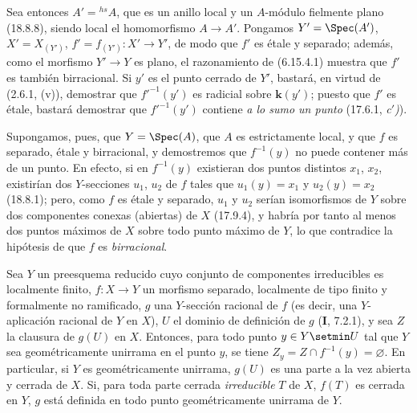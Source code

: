 
Sea entonces $A'={}^{hs}\!A$, que es un anillo local y un $A$-módulo fielmente plano (18.8.8), siendo local el homomorfismo $A\to A'$. Pongamos $Y'=\Spec(A')$, $X'=X_{(Y')}$, $f'=f_{(Y')}:X'\to Y'$, de modo que $f'$ es étale y separado; además, como el morfismo $Y'\to Y$ es plano, el razonamiento de (6.15.4.1) muestra que $f'$ es también birracional. Si $y'$ es el punto cerrado de $Y'$, bastará, en virtud de (2.6.1, (v)), demostrar que $f'^{-1}(y')$ es radicial sobre $\boldsymbol k(y')$; puesto que $f'$ es étale, bastará demostrar que $f'^{-1}(y')$ contiene \emph{a lo sumo un punto} (17.6.1, \emph{c$'$)}).

Supongamos, pues, que $Y=\Spec(A)$, que $A$ es estrictamente local, y que $f$ es separado, étale y birracional, y demostremos que $f^{-1}(y)$ no puede contener más de un punto. En efecto, si en $f^{-1}(y)$ existieran dos puntos distintos $x_1$, $x_2$, existirían dos $Y$-secciones $u_1$, $u_2$ de $f$ tales que $u_1(y)=x_1$ y $u_2(y)=x_2$ (18.8.1); pero, como $f$ es étale y separado, $u_1$ y $u_2$ serían isomorfismos de $Y$ sobre dos componentes conexas (abiertas) de $X$ (17.9.4), y habría por tanto al menos dos puntos máximos de $X$ sobre todo punto máximo de $Y$, lo que contradice la hipótesis de que $f$ es \emph{birracional}.

\begin{proposition}[18.10.19]
\label{IV.18.10.19}
Sea $Y$ un preesquema reducido cuyo conjunto de componentes irreducibles es localmente finito, $f:X\to Y$ un morfismo separado, localmente de tipo finito y formalmente no ramificado, $g$ una $Y$-sección racional de $f$ \textup{(es decir,} una $Y$-aplicación racional de $Y$ en $X$\textup{)}, $U$ el dominio de definición de $g$ \textup{(\textbf I, 7.2.1)}, y sea $Z$ la clausura de $g(U)$ en $X$. Entonces, para todo punto $y\in Y\setmin U$ tal que $Y$ sea geométricamente unirrama en el punto $y$, se tiene $Z_y=Z\cap f^{-1}(y)=\varnothing$. En particular, si $Y$ es geométricamente unirrama, $g(U)$ es una parte a la vez abierta y cerrada de $X$. Si, para toda parte cerrada \emph{irreducible} $T$ de $X$, $f(T)$ es cerrada en $Y$, $g$ está definida en todo punto geométricamente unirrama de $Y$.
\end{proposition}

